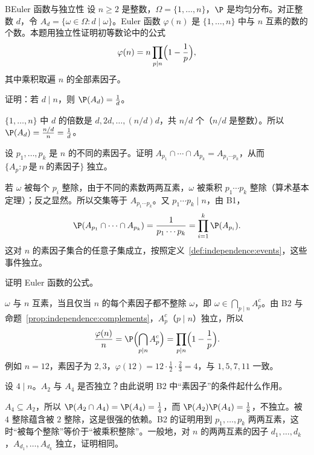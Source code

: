 \begin{probleme}{B}{Euler 函数与独立性}
设 $n\geqslant2$ 是整数，$\Omega=\{1,\dots,n\}$，$\P$ 是均匀分布。对正整数 $d$，令 $A_d=\{\omega\in\Omega:d\mid\omega\}$。Euler 函数 $\varphi(n)$ 是 $\{1,\dots,n\}$ 中与 $n$ 互素的数的个数。本题用独立性证明初等数论中的公式
\[
\varphi(n)=n\prod_{p\mid n}\Bigl(1-\frac1p\Bigr),
\]
其中乘积取遍 $n$ 的全部素因子。
\begin{questions}
\item 证明：若 $d\mid n$，则 $\P(A_d)=\frac1d$。
\begin{solution}
$\{1,\dots,n\}$ 中 $d$ 的倍数是 $d,2d,\dots,(n/d)d$，共 $n/d$ 个（$n/d$ 是整数）。所以 $\P(A_d)=\frac{n/d}n=\frac1d$。
\end{solution}

\item 设 $p_1,\dots,p_k$ 是 $n$ 的不同的素因子。证明 $A_{p_1}\cap\cdots\cap A_{p_k}=A_{p_1\cdots p_k}$，从而 $\{A_p:p\ \text{是}\ n\ \text{的素因子}\}$ 独立。
\begin{solution}
若 $\omega$ 被每个 $p_i$ 整除，由于不同的素数两两互素，$\omega$ 被乘积 $p_1\cdots p_k$ 整除（算术基本定理）；反之显然。所以交集等于 $A_{p_1\cdots p_k}$。又 $p_1\cdots p_k\mid n$，由 B1，
\[
\P(A_{p_1}\cap\cdots\cap A_{p_k})=\frac1{p_1\cdots p_k}=\prod_{i=1}^k\P(A_{p_i}).
\]
这对 $n$ 的素因子集合的任意子集成立，按照定义~\ref{def:independence:events}，这些事件独立。
\end{solution}

\item 证明 Euler 函数的公式。
\begin{solution}
$\omega$ 与 $n$ 互素，当且仅当 $n$ 的每个素因子都不整除 $\omega$，即 $\omega\in\bigcap_{p\mid n}A_p^c$。由 B2 与命题~\ref{prop:independence:complements}，$A_p^c$（$p\mid n$）独立，所以
\[
\frac{\varphi(n)}n=\P\Bigl(\bigcap_{p\mid n}A_p^c\Bigr)=\prod_{p\mid n}\Bigl(1-\frac1p\Bigr).
\]
例如 $n=12$，素因子为 $2,3$，$\varphi(12)=12\cdot\frac12\cdot\frac23=4$，与 $1,5,7,11$ 一致。
\end{solution}

\item 设 $4\mid n$。$A_2$ 与 $A_4$ 是否独立？由此说明 B2 中“素因子”的条件起什么作用。
\begin{solution}
$A_4\subseteq A_2$，所以 $\P(A_2\cap A_4)=\P(A_4)=\frac14$，而 $\P(A_2)\P(A_4)=\frac18$，不独立。被 $4$ 整除蕴含被 $2$ 整除，这是很强的依赖。B2 的证明用到 $p_1,\dots,p_k$ 两两互素，这时“被每个整除”等价于“被乘积整除”。一般地，对 $n$ 的两两互素的因子 $d_1,\dots,d_k$，$A_{d_1},\dots,A_{d_k}$ 独立，证明相同。
\end{solution}
\end{questions}
\end{probleme}

